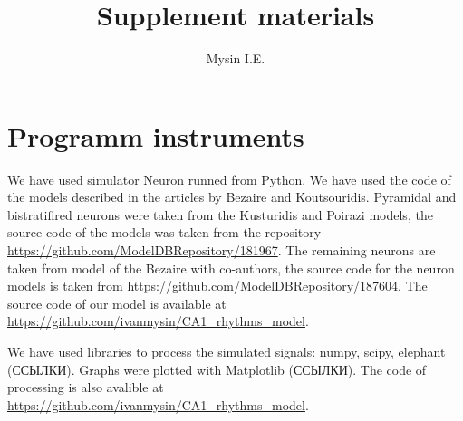 \documentclass[a4paper,12pt]{article}
\title{Supplement materials}
\author{Mysin I.E.}
\date{}
\begin{document}
\maketitle

\section{Programm instruments}
We have used simulator Neuron runned from Python. We have used the code of the models described in the articles by Bezaire and Koutsouridis. Pyramidal and bistratifired neurons were taken from the Kusturidis and Poirazi models, the source code of the models was taken from the repository \url{https://github.com/ModelDBRepository/181967}. The remaining neurons are taken from model of the Bezaire  with co-authors, the source code for the neuron models is taken from \url{https://github.com/ModelDBRepository/187604}. The source code of our model is available at \url{https://github.com/ivanmysin/CA1\_rhythms\_model}. \par
We have used libraries to process the simulated signals: numpy, scipy, elephant (ССЫЛКИ). Graphs were plotted with Matplotlib (ССЫЛКИ). The code of processing is also avalible at \url{https://github.com/ivanmysin/CA1\_rhythms\_model}.
\end{document}
